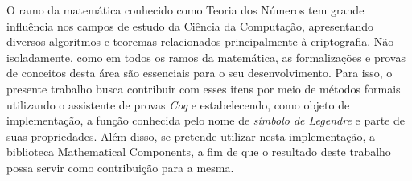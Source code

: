\setlength{\absparsep}{18pt}
\begin{resumo}

        \noindent
        O ramo da matemática conhecido como Teoria dos Números tem grande influência nos campos de estudo da Ciência da Computação, apresentando diversos algoritmos e teoremas relacionados principalmente à criptografia. Não isoladamente, como em todos os ramos da matemática, as formalizações e provas de conceitos desta área são essenciais para o seu desenvolvimento. Para isso, o presente trabalho busca contribuir com esses itens por meio de métodos formais utilizando o assistente de provas \textit{Coq} e estabelecendo, como objeto de implementação, a função conhecida pelo nome de \textit{símbolo de Legendre} e parte de suas propriedades. Além disso, se pretende utilizar nesta implementação, a biblioteca Mathematical Components, a fim de que o resultado deste trabalho possa servir como contribuição para a mesma.\\


        

\end{resumo}
